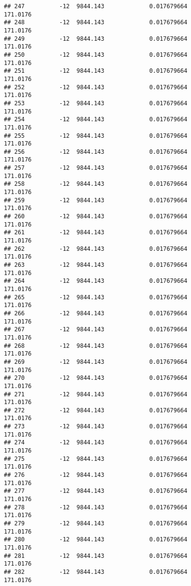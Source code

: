 \documentclass[]{article}
\begin{document}
\begin{verbatim}
## 247          -12  9844.143             0.017679664           171.0176
## 248          -12  9844.143             0.017679664           171.0176
## 249          -12  9844.143             0.017679664           171.0176
## 250          -12  9844.143             0.017679664           171.0176
## 251          -12  9844.143             0.017679664           171.0176
## 252          -12  9844.143             0.017679664           171.0176
## 253          -12  9844.143             0.017679664           171.0176
## 254          -12  9844.143             0.017679664           171.0176
## 255          -12  9844.143             0.017679664           171.0176
## 256          -12  9844.143             0.017679664           171.0176
## 257          -12  9844.143             0.017679664           171.0176
## 258          -12  9844.143             0.017679664           171.0176
## 259          -12  9844.143             0.017679664           171.0176
## 260          -12  9844.143             0.017679664           171.0176
## 261          -12  9844.143             0.017679664           171.0176
## 262          -12  9844.143             0.017679664           171.0176
## 263          -12  9844.143             0.017679664           171.0176
## 264          -12  9844.143             0.017679664           171.0176
## 265          -12  9844.143             0.017679664           171.0176
## 266          -12  9844.143             0.017679664           171.0176
## 267          -12  9844.143             0.017679664           171.0176
## 268          -12  9844.143             0.017679664           171.0176
## 269          -12  9844.143             0.017679664           171.0176
## 270          -12  9844.143             0.017679664           171.0176
## 271          -12  9844.143             0.017679664           171.0176
## 272          -12  9844.143             0.017679664           171.0176
## 273          -12  9844.143             0.017679664           171.0176
## 274          -12  9844.143             0.017679664           171.0176
## 275          -12  9844.143             0.017679664           171.0176
## 276          -12  9844.143             0.017679664           171.0176
## 277          -12  9844.143             0.017679664           171.0176
## 278          -12  9844.143             0.017679664           171.0176
## 279          -12  9844.143             0.017679664           171.0176
## 280          -12  9844.143             0.017679664           171.0176
## 281          -12  9844.143             0.017679664           171.0176
## 282          -12  9844.143             0.017679664           171.0176

\end{verbatim}
\end{document}
